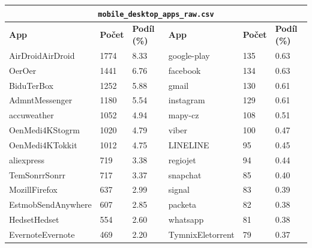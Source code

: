 \begin{table}[h!]
	\centering
	\begin{tabular}{llllll}
		\toprule
		\multicolumn{6}{c}{\texttt{mobile\_desktop\_apps\_raw.csv}} \\
		\midrule
		\textbf{App}   & \textbf{Počet} & \textbf{Podíl (\%)} & \textbf{App}       & \textbf{Počet} & \textbf{Podíl (\%)} \\
		\midrule
		AirDroidAirDroid    & 1774            & 8.33                 & google-play             & 135             & 0.63                 \\
		OerOer              & 1441            & 6.76                 & facebook                & 134             & 0.63                 \\
		BiduTerBox          & 1252            & 5.88                 & gmail                   & 130             & 0.61                 \\
		AdmntMessenger      & 1180            & 5.54                 & instagram               & 129             & 0.61                 \\
		accuweather         & 1052            & 4.94                 & mapy-cz                 & 108             & 0.51                 \\
		OenMedi4KStogrm     & 1020            & 4.79                 & viber                   & 100             & 0.47                 \\
		OenMedi4KTokkit     & 1012            & 4.75                 & LINELINE                & 95              & 0.45                 \\
		aliexpress          & 719             & 3.38                 & regiojet                & 94              & 0.44                 \\
		TemSonrrSonrr       & 717             & 3.37                 & snapchat                & 85              & 0.40                 \\
		MozillFirefox       & 637             & 2.99                 & signal                  & 83              & 0.39                 \\
		EstmobSendAnywhere  & 607             & 2.85                 & packeta                 & 82              & 0.38                 \\
		HedsetHedset        & 554             & 2.60                 & whatsapp                & 81              & 0.38                 \\
		EvernoteEvernote    & 469             & 2.20                 & TymnixEletorrent        & 79              & 0.37                 \\

\end{tabular}
\end{table}
